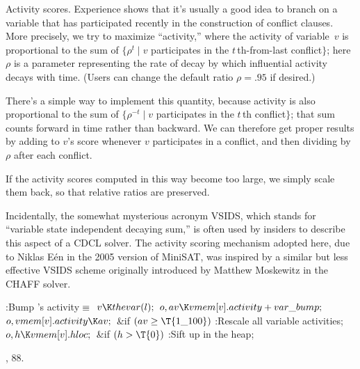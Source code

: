 Activity scores.
Experience shows that it's usually a good idea to branch on a variable that
has participated recently in the construction of conflict clauses. More
precisely, we try to maximize ``activity,'' where the activity of variable~$v$
is proportional to the sum of $\{\rho^t\mid v$ participates in the
$t\,$th-from-last conflict$\}$; here $\rho$ is a parameter representing
the rate of decay by which influential activity decays with time.
(Users can change the default ratio $\rho=.95$ if desired.)

There's a simple way to implement this quantity, because activity is
also proportional to the sum of $\{\rho^{-t}\mid v$ participates in the
$t\,$th conflict$\}$; that sum counts forward in time rather than backward.
We can therefore get proper results by adding  to $v$'s score
whenever $v$ participates in a conflict, and then dividing 
by~$\rho$ after each conflict.

If the activity scores computed in this way become too large, we simply
scale them back, so that relative ratios are preserved.

Incidentally, the somewhat mysterious acronym {\mc VSIDS}, which
stands for ``variable state independent decaying sum,'' is often
used by insiders to describe this aspect of a CDCL solver. The
activity scoring mechanism adopted here, due to Niklas E\'en
in the 2005 version of MiniSAT, was inspired by a
similar but less effective {\mc VSIDS} scheme originally introduced
by Matthew Moskewitz in the {\mc CHAFF} solver.

\Y\B\4:Bump 's activity\X${}\equiv{}$\6
$\|v\K\\{thevar}(\|l);{}$\6
${}\|o,\39\\{av}\K\\{vmem}[\|v].\\{activity}+\\{var\_bump};{}$\6
${}\|o,\39\\{vmem}[\|v].\\{activity}\K\\{av};{}$\6
\&{if} ${}(\\{av}\G\T{1\_100}){}$\1\5
:Rescale all variable activities\X;\2\6
${}\|o,\39\|h\K\\{vmem}[\|v].\\{hloc};{}$\6
\&{if} ${}(\|h>\T{0}){}$\1\5
:Sift  up in the heap\X;\2\par
{}, 88.\fi

